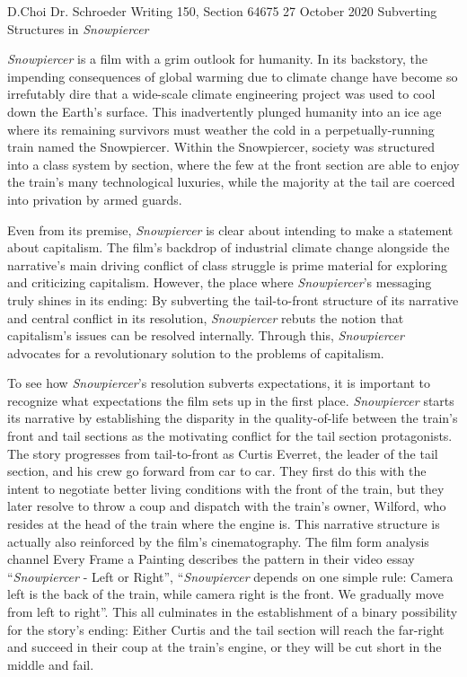 \documentclass[12pt, letterpaper]{article}
\begin{document}
\begin{mla}
	{D.}{Choi}
	{Dr. Schroeder}
	{Writing 150, Section 64675}
	{27 October 2020}
	{Subverting Structures in \textit{Snowpiercer}}


\textit{Snowpiercer} is a film with a grim outlook for humanity. In its
backstory, the impending consequences of global warming due to climate change
have become so irrefutably dire that a wide-scale climate engineering project
was used to cool down the Earth's surface. This inadvertently plunged humanity
into an ice age where its remaining survivors must weather the cold in a
perpetually-running train named the Snowpiercer. Within the Snowpiercer,
society was structured into a class system by section, where the few at the
front section are able to enjoy the train's many technological luxuries, while
the majority at the tail are coerced into privation by armed guards.

Even from its premise, \textit{Snowpiercer} is clear about intending to make a
statement about capitalism. The film's backdrop of industrial climate change
alongside the narrative's main driving conflict of class struggle is prime
material for exploring and criticizing capitalism. However, the place where
\textit{Snowpiercer}'s messaging truly shines in its ending: By subverting the
tail-to-front structure of its narrative and central conflict in its
resolution, \textit{Snowpiercer} rebuts the notion that capitalism's issues
can be resolved internally. Through this, \textit{Snowpiercer} advocates for
a revolutionary solution to the problems of capitalism.

To see how \textit{Snowpiercer}'s resolution subverts expectations, it is
important to recognize what expectations the film sets up in the first place.
\textit{Snowpiercer} starts its narrative by establishing the disparity in the
quality-of-life between the train's front and tail sections as the motivating
conflict for the tail section protagonists. The story progresses from
tail-to-front as Curtis Everret, the leader of the tail section, and his
crew go forward from car to car. They first do this with the intent to
negotiate better living conditions with the front of the train, but they later
resolve to throw a coup and dispatch with the train's owner, Wilford, who
resides at the head of the train where the engine is. This narrative structure
is actually also reinforced by the film's cinematography. The film form
analysis channel Every Frame a Painting describes the pattern in their video
essay ``\textit{Snowpiercer} - Left or Right'', ``\textit{Snowpiercer} depends
on one simple rule: Camera left is the back of the train, while camera right
is the front. We gradually move from left to right''. This all culminates in
the establishment of a binary possibility for the story's ending: Either
Curtis and the tail section will reach the far-right and succeed in their coup
at the train's engine, or they will be cut short in the middle and fail.


\end{mla}
\end{document}
